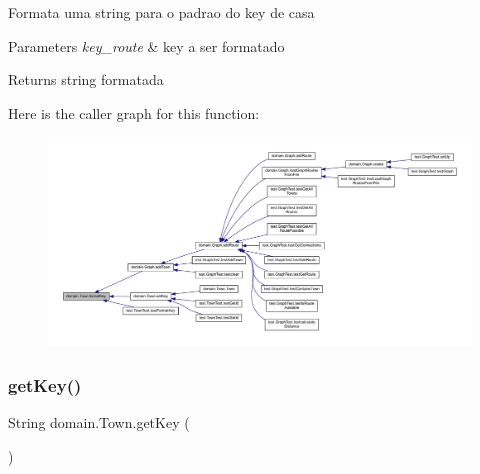 Formata uma string para o padrao do key de casa


\begin{DoxyParams}{Parameters}
{\em key\+\_\+route} & key a ser formatado \\
\hline
\end{DoxyParams}
\begin{DoxyReturn}{Returns}
string formatada 
\end{DoxyReturn}
Here is the caller graph for this function\+:\nopagebreak
\begin{figure}[H]
\begin{center}
\leavevmode
\includegraphics[width=350pt]{classdomain_1_1_town_a6a88af9728067dd135eea6df9591496b_icgraph}
\end{center}
\end{figure}
\mbox{\label{classdomain_1_1_town_a4d9996c44520ba3639163348b1c1d2ca}} 
\subsubsection{\texorpdfstring{get\+Key()}{getKey()}}
{\footnotesize\ttfamily String domain.\+Town.\+get\+Key (\begin{DoxyParamCaption}{ }\end{DoxyParamCaption})}

